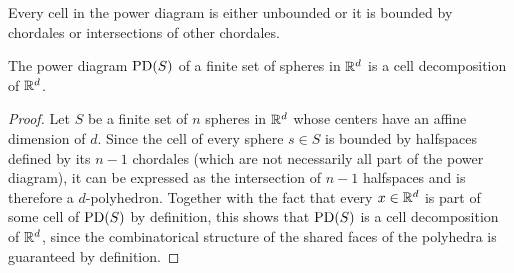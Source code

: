 Every cell in the power diagram is either unbounded or it is bounded by chordales or intersections of other chordales.
\begin{lemma}
    The power diagram $\operatorname{PD}(S)$ of a finite set of spheres in $\mathbb{R}^d$ is a cell decomposition of $\mathbb{R}^d$.
\end{lemma}
\begin{proof}
    Let $S$ be a finite set of $n$ spheres in $\mathbb{R}^d$ whose centers have an affine dimension of $d$.
    Since the cell of every sphere $s \in S$ is bounded by halfspaces defined by its $n - 1$ chordales (which are not necessarily all part of the power diagram), it can be expressed as the intersection of $n - 1$ halfspaces and is therefore a $d$-polyhedron.
    Together with the fact that every $x \in \mathbb{R}^d$ is part of some cell of $\operatorname{PD}(S)$ by definition, this shows that $\operatorname{PD}(S)$ is a cell decomposition of $\mathbb{R}^d$, since the combinatorical structure of the shared faces of the polyhedra is guaranteed by definition.
\end{proof}

